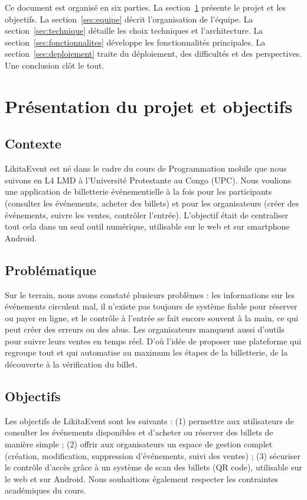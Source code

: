 \documentclass[11pt,a4paper,oneside]{article}
\begin{document}
Ce document est organisé en six parties. La section~\ref{sec:presentation} présente le projet et les objectifs. La section~\ref{sec:equipe} décrit l'organisation de l'équipe. La section~\ref{sec:technique} détaille les choix techniques et l'architecture. La section~\ref{sec:fonctionnalites} développe les fonctionnalités principales. La section~\ref{sec:deploiement} traite du déploiement, des difficultés et des perspectives. Une conclusion clôt le tout.

\section{Présentation du projet et objectifs}
\label{sec:presentation}

\subsection{Contexte}

LikitaEvent est né dans le cadre du cours de Programmation mobile que nous suivons en L4 LMD à l'Université Protestante au Congo (UPC). Nous voulions une application de billetterie événementielle à la fois pour les participants (consulter les événements, acheter des billets) et pour les organisateurs (créer des événements, suivre les ventes, contrôler l'entrée). L'objectif était de centraliser tout cela dans un seul outil numérique, utilisable sur le web et sur smartphone Android.

\subsection{Problématique}

Sur le terrain, nous avons constaté plusieurs problèmes : les informations sur les événements circulent mal, il n'existe pas toujours de système fiable pour réserver ou payer en ligne, et le contrôle à l'entrée se fait encore souvent à la main, ce qui peut créer des erreurs ou des abus. Les organisateurs manquent aussi d'outils pour suivre leurs ventes en temps réel. D'où l'idée de proposer une plateforme qui regroupe tout et qui automatise au maximum les étapes de la billetterie, de la découverte à la vérification du billet.

\subsection{Objectifs}

Les objectifs de LikitaEvent sont les suivants : (1) permettre aux utilisateurs de consulter les événements disponibles et d'acheter ou réserver des billets de manière simple ; (2) offrir aux organisateurs un espace de gestion complet (création, modification, suppression d'événements, suivi des ventes) ; (3) sécuriser le contrôle d'accès grâce à un système de scan des billets (QR code), utilisable sur le web et sur Android. Nous souhaitions également respecter les contraintes académiques du cours.
\end{document}
